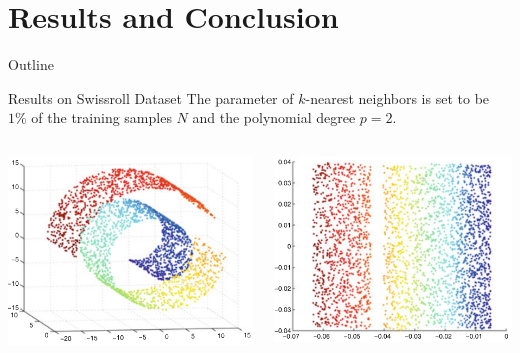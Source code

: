 \documentclass{beamer}
\begin{document}
\section{Results and Conclusion}
\begin{frame}{Outline}
\tableofcontents[current]
\end{frame}
\begin{frame}{Results on Swissroll Dataset}
    The parameter of $k$-nearest neighbors is set to be $1\%$ of the training samples $N$ and the polynomial degree $p=2$.    \vspace{1cm} 
    \begin{columns} %
        \begin{column}{.5\textwidth} %
            \includegraphics[width=0.8\linewidth]{images/hd.png}
            \caption{SwissRoll dataset in $\mathbf{R}^3$}
        \end{column}
        \begin{column}{.5\textwidth} %
            \includegraphics[width=0.8\linewidth]{images/ld.png}
            \caption{SwissRoll representation in $\mathbf{R}^2$}
        \end{column}
    \end{columns}
\end{frame}
\end{document}
